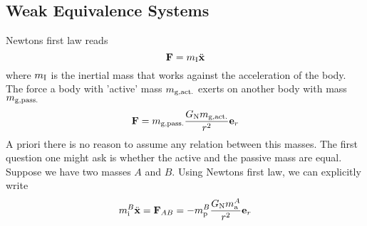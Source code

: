 \subsection*{Weak Equivalence Systems}
Newtons first law reads
\begin{equation}
    \vec{F}=m\textsubscript{I}\ddot{\vec{x}}
\end{equation}
where $m\textsubscript{I}$ is the inertial mass that works against the acceleration of the body.
The force a body with 'active' mass $m\textsubscript{g,act.}$ exerts on another
body with mass $m\textsubscript{g,pass.}$
\begin{equation}
    \vec{F}=m\textsubscript{g,pass.}\frac{G\textsubscript{N}m\textsubscript{g,act.}}{r^2}\vec{e}_r
\end{equation}
A priori there is no reason to assume any relation between this masses. 
The first question one might ask is whether the active and the passive mass are equal. 
Suppose we have two masses $A$ and $B$. Using Newtons first law, we can explicitly write
\begin{equation}
    m^{B}_{\text{i}}\ddot{\vec{x}}=\vec{F}_{AB}=-	m^{B}_{\text{p}}\frac{G\textsubscript{N}m^{A}_{\text{a}}}{r^2}\vec{e}_r
\end{equation}
